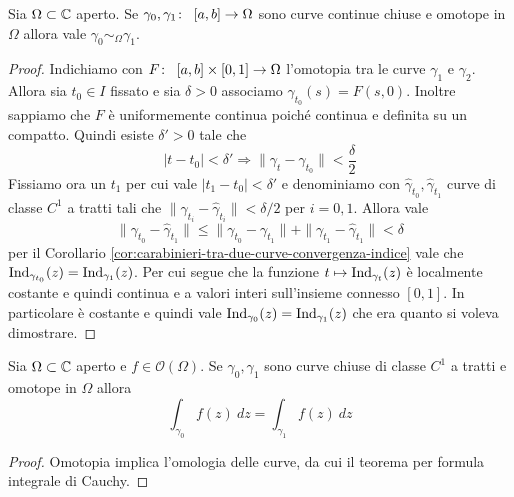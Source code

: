 \begin{theorem}
  Sia $\Omega \subset \mathbb{C}$ aperto. Se $\gamma_0, \gamma_1 \colon\ \left[
  a,b \right] \rightarrow \Omega$ sono curve continue chiuse e omotope in $\Omega$
  allora vale $\gamma_0 \sim_\Omega \gamma_1$.
  \label{thr:omotopia-implica-omologia}
\end{theorem}
\begin{proof}
  Indichiamo con $F \colon\ \left[ a,b \right]\times \left[ 0,1
  \right] \rightarrow \Omega$ l'omotopia tra le curve $\gamma_1$ e $\gamma_2$. Allora
  sia $t_0 \in I$ fissato e sia $\delta > 0$ associamo $\gamma_{t_0}(s) 
  = F(s, 0)$. Inoltre sappiamo che $F$ è uniformemente continua poiché
  continua e definita su un compatto. Quindi esiste $\delta' >0$ tale che 
  \begin{equation*}
    |t-t_0| < \delta' \Longrightarrow \|\gamma_t - \gamma_{t_0}\| < \frac{\delta}{2}
  \end{equation*}
  Fissiamo ora un $t_1$ per cui vale $|t_1- t_0| < \delta'$ e denominiamo
  con $\hat{\gamma}_{t_0}, \hat{\gamma}_{t_1}$ curve di classe $C^1$
  a tratti tali che $\|\gamma_{t_i} - \hat{\gamma}_{t_i}\| < \delta/2$ per
  $i = 0,1$. Allora vale 
  \begin{equation*}
    \|\gamma_{t_0} - \hat{\gamma}_{t_1}\| \le \|\gamma_{t_0}
    - \gamma_{t_1}\| + \|\gamma_{t_1} - \hat{\gamma}_{t_1}\| < \delta
  \end{equation*}
  per il Corollario \ref{cor:carabinieri-tra-due-curve-convergenza-indice}
  vale che $\operatorname{Ind}_{\gamma_{t_0}}(z)
  = \operatorname{Ind}_{{\gamma}_1}(z)$. Per cui segue che la funzione $t
  \mapsto \operatorname{Ind}_{\gamma_t}(z)$ è localmente costante e quindi
  continua e a valori interi sull'insieme connesso $\left[ 0,1 \right]$. In
  particolare è costante e quindi vale $\operatorname{Ind}_{\gamma_0}(z)
  = \operatorname{Ind}_{\gamma_1}(z)$ che era quanto si voleva dimostrare.
\end{proof}

\begin{corollary}
  Sia $\Omega \subset \mathbb{C}$ aperto e $f \in \mathcal{O}(\Omega)$. Se
  $\gamma_0, \gamma_1$ sono curve chiuse di classe $C^1$ a tratti e omotope
  in $\Omega$ allora 
  \begin{equation*}
    \int_{\gamma_0} f(z)\ dz =  \int_{\gamma_1} f(z)\ dz
  \end{equation*}
  \label{cor:omotopia-implica-integrali-di-linea-uguali}
\end{corollary}
\begin{proof}
  Omotopia implica l'omologia delle curve, da cui il teorema per formula
  integrale di Cauchy.
\end{proof}

